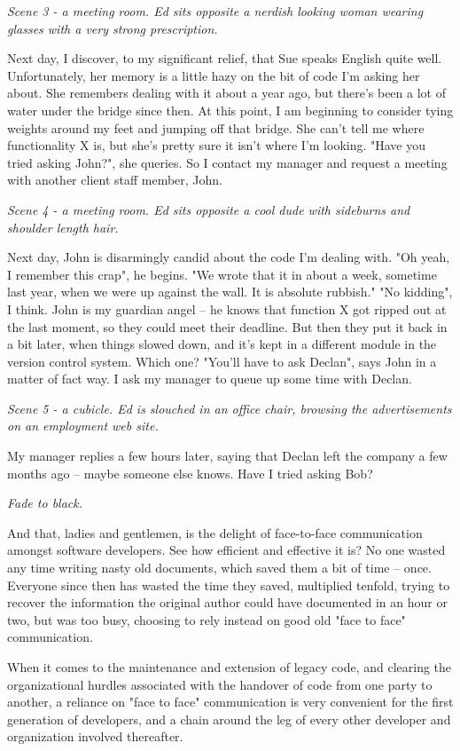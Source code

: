 \documentclass{article}
\begin{document}
\emph{Scene 3 - a meeting room. Ed sits opposite a nerdish looking woman
wearing glasses with a very strong prescription.}

Next day, I discover, to my significant relief, that Sue speaks English
quite well. Unfortunately, her memory is a little hazy on the bit of
code I'm asking her about. She remembers dealing with it about a year
ago, but there's been a lot of water under the bridge since then. At
this point, I am beginning to consider tying weights around my feet and
jumping off that bridge. She can't tell me where functionality X is, but
she's pretty sure it isn't where I'm looking. "Have you tried asking
John?", she queries. So I contact my manager and request a meeting with
another client staff member, John.

\emph{Scene 4 - a meeting room. Ed sits opposite a cool dude with sideburns
and shoulder length hair.}

Next day, John is disarmingly candid about the code I'm dealing with.
"Oh yeah, I remember this crap", he begins. "We wrote that it in about a
week, sometime last year, when we were up against the wall. It is
absolute rubbish." "No kidding", I think. John is my guardian angel --
he knows that function X got ripped out at the last moment, so they
could meet their deadline. But then they put it back in a bit later,
when things slowed down, and it's kept in a different module in the
version control system. Which one? "You'll have to ask Declan", says
John in a matter of fact way. I ask my manager to queue up some time
with Declan.

\emph{Scene 5 - a cubicle. Ed is slouched in an office chair, browsing the
advertisements on an employment web site.}

My manager replies a few hours later, saying that Declan left the
company a few months ago -- maybe someone else knows. Have I tried
asking Bob?

\emph{Fade to black.}

And that, ladies and gentlemen, is the delight of face-to-face
communication amongst software developers. See how efficient and
effective it is? No one wasted any time writing nasty old documents,
which saved them a bit of time -- once. Everyone since then has wasted
the time they saved, multiplied tenfold, trying to recover the
information the original author could have documented in an hour or two,
but was too busy, choosing to rely instead on good old "face to face"
communication.

When it comes to the maintenance and extension of legacy code, and
clearing the organizational hurdles associated with the handover of code
from one party to another, a reliance on "face to face" communication is
very convenient for the first generation of developers, and a chain
around the leg of every other developer and organization involved
thereafter.
\end{document}
